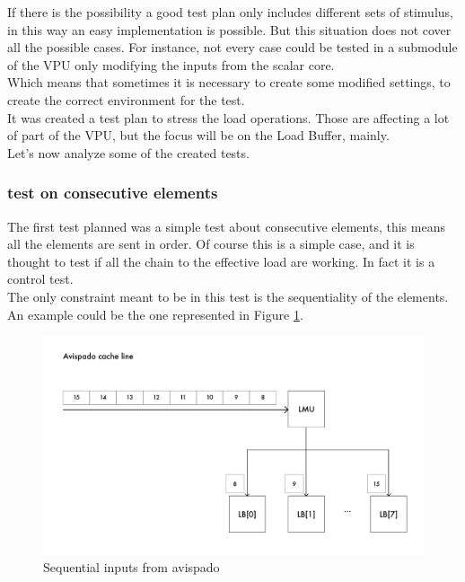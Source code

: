 If there is the possibility a good test plan only includes different sets of stimulus, in this way an easy implementation is possible. But this situation does not cover all the possible cases. For instance, not every case could be tested in a submodule of the VPU only modifying the inputs from the scalar core.\\
Which means that sometimes it is necessary to create some modified settings, to create the correct environment for the test.\\

It was created a test plan to stress the load operations. Those are affecting a lot of part of the VPU, but the focus will be on the Load Buffer, mainly.\\
Let's now analyze some of the created tests.

\subsubsection{test on consecutive elements}
The first test planned was a simple test about consecutive elements, this means all the elements are sent in order. Of course this is a simple case, and it is thought to test if all the chain to the effective load are working. In fact it is a control test.\\

The only constraint meant to be in this test is the sequentiality of the elements.\\
An example could be the one represented in Figure \ref{cache-to-lb-seq-ex}.


\begin{figure}[H]
    \centering
    \includegraphics[scale = 0.6]{Chapter_2/img/cache-to-lb-seq-ex.png}
    \caption{Sequential inputs from avispado}
    \label{cache-to-lb-seq-ex}
\end{figure}

